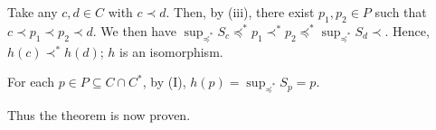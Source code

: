\documentclass[../introduction_to_set_theory_Note.tex]{subfiles}
\begin{document}
{{\begin{itemize}[nolistsep, leftmargin=*, listparindent=\parindent]
            \ii
            Take any \(c, d \in C\) with \(c \prec d\).
            Then, by (iii), there exist \(p_1, p_2 \in P\) such that \(c \prec p_1 \prec p_2 \prec d\).
            We then have \(\sup_{\preceq^\ast} S_c \preceq^\ast p_1 \prec^\ast p_2 \preceq^\ast \sup_{\preceq^\ast} S_d \prec\).
            Hence, \(h(c) \prec^\ast h(d)\); \(h\) is an isomorphism. \checkmark

            \ii
            For each \(p \in P \subseteq C \cap C^\ast\), by (I),
            \(h(p) = \sup_{\preceq^\ast} S_p = p\). \checkmark
        \end{itemize}
    }
    \noindent
    Thus the theorem is now proven.
}


\end{document}
